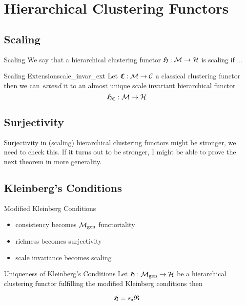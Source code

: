 \chapter{Hierarchical Clustering Functors}
\section{Scaling}

\begin{definition}{Scaling}{}
We say that a hierarchical clustering functor $\mathfrak{H}: \mathcal{M} \to \mathcal{H}$ is scaling if ...
\end{definition}

\begin{definition}{Scaling Extension}{scale_invar_ext}
Let $\mathfrak{C}: \mathcal{M} \to \mathcal{C}$ a classical clustering functor then we can \emph{extend} it to an almost unique scale invariant hierarchical functor
$$
\mathfrak{H}_{\mathfrak{C}}: \mathcal{M} \to \mathcal{H}
$$
\end{definition}

\section{Surjectivity}
Surjectivity in (scaling) hierarchical clustering functors might be stronger, we need to check this.
If it turns out to be stronger, I might be able to prove the next theorem in more generality.

\section{Kleinberg's Conditions}

\begin{myremark}{Modified Kleinberg Conditions}{}
    \cite[Comment~7.3.1]{Carlsson2010}


    \begin{itemize}
        \item consistency becomes ${\mathcal{M}_\mathrm{gen}}$ functoriality
        \item richness becomes surjectivity
        \item scale invariance becomes scaling
    \end{itemize}
\end{myremark}

\begin{theorem}{Uniqueness of Kleinberg's Conditions}{}
    Let $\mathfrak{H}: {\mathcal{M}_\mathrm{gen}} \to \mathcal{H}$ be a hierarchical clustering functor fulfilling the modified Kleinberg conditions then

    $$
    \mathfrak{H} = s_\delta \mathfrak{R}
    $$

\end{theorem}

